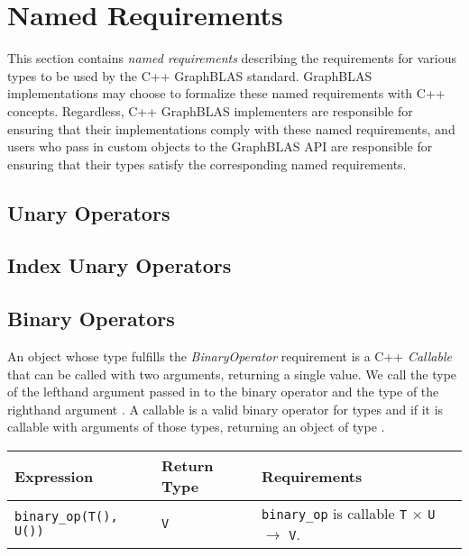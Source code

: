 \chapter{Named Requirements}
\label{Chp:NamedRequirements}

This section contains \textit{named requirements} describing the requirements for
various types to be used by the C++ GraphBLAS standard.
GraphBLAS implementations may choose to formalize these named requirements with
C++ concepts.  Regardless, C++ GraphBLAS implementers are responsible for
ensuring that their implementations comply with these named requirements, and
users who pass in custom objects to the GraphBLAS API are responsible for
ensuring that their types satisfy the corresponding named requirements.

\section{Unary Operators}

\section{Index Unary Operators}

\section{Binary Operators}
An object whose type fulfills the \textit{BinaryOperator} requirement is a C++
\textit{Callable} that can be called with two arguments, returning a single
value.  We call the type of the lefthand argument passed in to the binary operator
 and the type of the righthand argument .  A callable is a
valid binary operator for types  and  if it is callable with
arguments of those types, returning an object of type .

\begin{tabularx}{\textwidth}{l l X}
\textbf{Expression} & \textbf{Return Type} & \textbf{Requirements}\\
\hline
\texttt{binary\_op(T(), U())} & \texttt{V} & \texttt{binary\_op} is callable \texttt{T} $\times$ \texttt{U} $\rightarrow$ \texttt{V}.\\
\end{tabularx}

